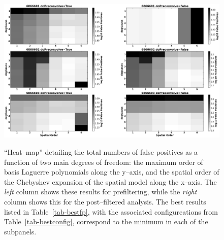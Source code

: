 \documentclass[prd, nofootinbib, floatfix, 11pt,tightenlines,times]{article}
\begin{document}
\clearpage

\begin{figure}
\includegraphics[width=1.0\textwidth]{figures/falsePos.eps} \\
\caption{``Heat--map'' detailing the total numbers of false positives
  as a function of two main degrees of freedom: the maximum order of
  basis Laguerre polynomials along the y--axis, and the spatial order
  of the Chebyshev expansion of the spatial model along the x--axis.
  The {\it left} column shows these results for prefiltering, while
  the {\it right} column shows this for the post--filtered analysis.
  The best results listed in Table~\ref{tab-bestfp}, with the
  associated configureations from Table~\ref{tab-bestconfig},
  correspond to the minimum in each of the subpanels.
}
\label{fp_heatmap}
\end{figure}
\end{document}
